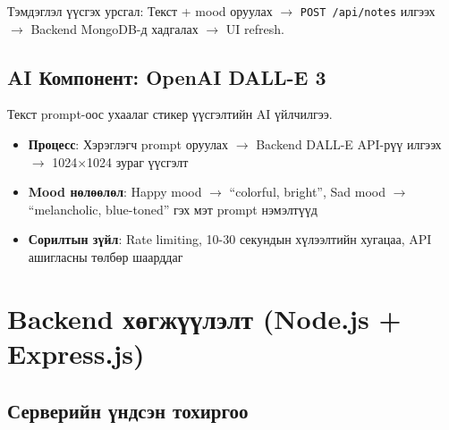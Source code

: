 Тэмдэглэл үүсгэх урсгал: Текст + mood оруулах $\rightarrow$ \texttt{POST /api/notes} илгээх $\rightarrow$ Backend MongoDB-д хадгалах $\rightarrow$ UI refresh.

\subsection{AI Компонент: OpenAI DALL-E 3}

Текст prompt-оос ухаалаг стикер үүсгэлтийн AI үйлчилгээ.

\begin{itemize}
  \item \textbf{Процесс}: Хэрэглэгч prompt оруулах $\rightarrow$ Backend DALL-E API-рүү илгээх $\rightarrow$ 1024×1024 зураг үүсгэлт
  \item \textbf{Mood нөлөөлөл}: Happy mood $\rightarrow$ ``colorful, bright'', Sad mood $\rightarrow$ ``melancholic, blue-toned'' гэх мэт prompt нэмэлтүүд
  \item \textbf{Сорилтын зүйл}: Rate limiting, 10-30 секундын хүлээлтийн хугацаа, API ашигласны төлбөр шаарддаг
\end{itemize}

\section{Backend хөгжүүлэлт (Node.js + Express.js)}

\subsection{Серверийн үндсэн тохиргоо}

